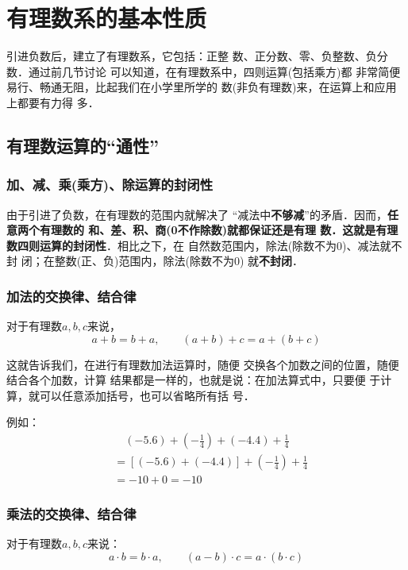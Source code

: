 \section{有理数系的基本性质}
    引进负数后，建立了有理数系，它包括：正整
数、正分数、零、负整数、负分数．通过前几节讨论
可以知道，在有理数系中，四则运算(包括乘方)都
非常简便易行、畅通无阻，比起我们在小学里所学的
数(非负有理数)来，在运算上和应用上都要有力得
多．

\subsection{有理数运算的“通性”}
  \subsubsection{加、减、乘(乘方)、除运算的封闭性}
    由于引进了负数，在有理数的范围内就解决了
  “减法中\textbf{不够减}”的矛盾．因而，\textbf{任意两个有理数的
和、差、积、商(0不作除数)就都保证还是有理
数．这就是有理数四则运算的封闭性}．相比之下，在
自然数范围内，除法(除数不为0)、减法就不封
闭；在整数(正、负)范围内，除法(除数不为0)
就\textbf{不封闭}．

\subsubsection{加法的交换律、结合律}
\begin{blk}{}
对于有理数$a,b,c$来说，
\[a+b=b+a,\qquad (a+b)+c=a+(b+c)\]
\end{blk}

这就告诉我们，在进行有理数加法运算时，随便
交换各个加数之间的位置，随便结合各个加数，计算
结果都是一样的，也就是说：在加法算式中，只要便
于计算，就可以任意添加括号，也可以省略所有括
号．

例如：
\[\begin{split}
&\quad (-5.6)+\left(-\frac{1}{4}\right)+(-4.4)+\frac{1}{4}\\
&=[(-5.6)+(-4.4)]+\left(-\frac{1}{4}\right)+\frac{1}{4}\\
&=-10+0=-10
\end{split}\]

\subsubsection{乘法的交换律、结合律}
\begin{blk}{}
    对于有理数$a, b, c$来说：
   \[ a\cdot b=b\cdot a,\qquad   (a-b)\cdot c=a\cdot  (b\cdot  c)\]
\end{blk}



